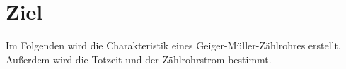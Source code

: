 \section{Ziel}
\label{sec:Ziel}

Im Folgenden wird die Charakteristik eines Geiger-Müller-Zählrohres erstellt.
Außerdem wird die Totzeit und der Zählrohrstrom bestimmt.